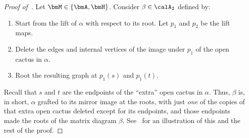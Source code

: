 \begin{proof}[Proof of~]
    Let $\bmM\in \{\bmA, \bmH\}$.
    Consider $\beta\in\calA_2$ defined by:
    \begin{enumerate}
        \item Start from the lift of $\alpha$
        with respect to its root. 
        Let $p_1$ and $p_2$ be the lift maps.
        \item Delete the edges and
        internal vertices of the image under $p_1$ of the
        open cactus in $\alpha$.
        \item Root the resulting graph at $p_1(s)$ and $p_1(t)$.
    \end{enumerate}
    Recall that $s$ and $t$ are the endpoints of the ``extra'' open cactus in $\alpha$.
    Thus, $\beta$ is, in short, $\alpha$ grafted to its mirror image at the roots, with just \emph{one} of the copies of that extra open cactus deleted except for its endpoints, and those endpoints made the roots of the matrix diagram $\beta$.
    See~ for an illustration of this and the rest of the proof.
    

\end{proof}
